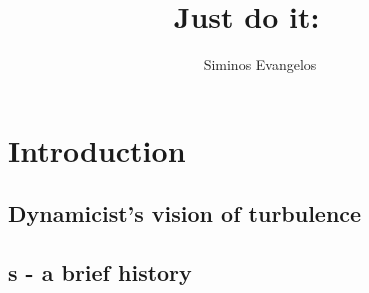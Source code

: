\documentclass[hyperref]{inputs/gatech-thesis}
\title{Just do it:    \KS\  \statesp}
\author{Siminos Evangelos}
\begin{document}


\begin{preliminary}

    \begin{dedication}
        
    \end{dedication}

    \begin{preface}
        
    \end{preface}

    \begin{acknowledgements}
        
    \end{acknowledgements}

    \contents

    \begin{summary}
%
    \end{summary}

\end{preliminary}




\chapter{Introduction}
%

\section{Dynamicist's vision of turbulence}
\label{s:hopf}
%    
    \section{{\Rpo s} - a brief history}
        
\end{document}
